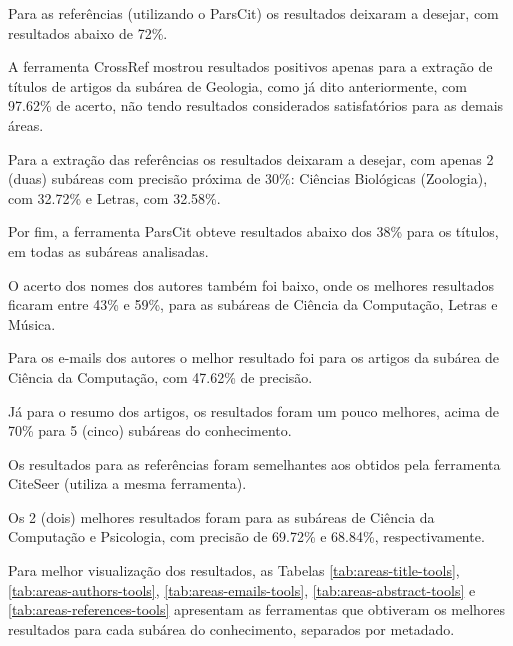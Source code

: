 Para as referências (utilizando o ParsCit) os resultados deixaram a desejar, com resultados abaixo de 72\%.

A ferramenta CrossRef mostrou resultados positivos apenas para a extração de títulos de artigos da subárea de Geologia, como já dito anteriormente, com 97.62\% de acerto, não tendo resultados considerados satisfatórios para as demais áreas. 

Para a extração das referências os resultados deixaram a desejar, com apenas 2 (duas) subáreas com precisão próxima de 30\%: Ciências Biológicas (Zoologia), com 32.72\% e Letras, com 32.58\%.

Por fim, a ferramenta ParsCit obteve resultados abaixo dos 38\% para os títulos, em todas as subáreas analisadas. 

O acerto dos nomes dos autores também foi baixo, onde os melhores resultados ficaram entre 43\% e 59\%, para as subáreas de Ciência da Computação, Letras e Música. 

Para os e-mails dos autores o melhor resultado foi para os artigos da subárea de Ciência da Computação, com 47.62\% de precisão. 

Já para o resumo dos artigos, os resultados foram um pouco melhores, acima de 70\% para 5 (cinco) subáreas do conhecimento. 

Os resultados para as referências foram semelhantes aos obtidos pela ferramenta CiteSeer (utiliza a mesma ferramenta). 

Os 2 (dois) melhores resultados foram para as subáreas de Ciência da Computação e Psicologia, com precisão de 69.72\% e 68.84\%, respectivamente.

Para melhor visualização dos resultados, as Tabelas \ref{tab:areas-title-tools}, \ref{tab:areas-authors-tools}, \ref{tab:areas-emails-tools}, \ref{tab:areas-abstract-tools} e \ref{tab:areas-references-tools} apresentam as ferramentas que obtiveram os melhores resultados para cada subárea do conhecimento, separados por metadado. 

